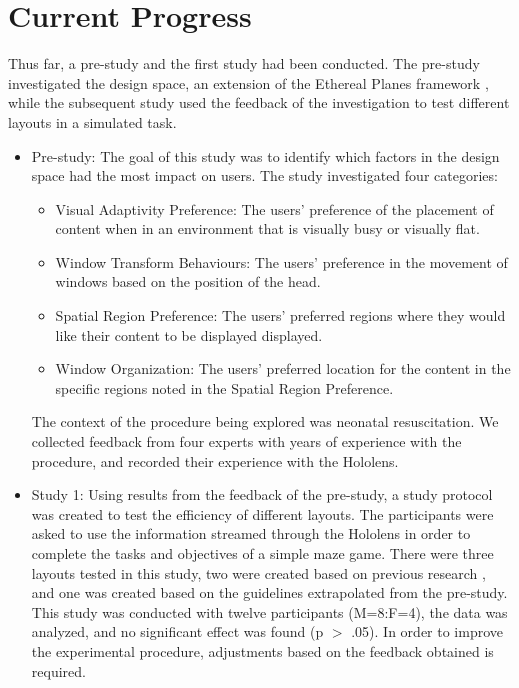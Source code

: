 \section{Current Progress}
\label{sec:currentprogress}
Thus far, a pre-study and the first study had been conducted. The pre-study investigated the design space, an extension of the Ethereal Planes framework \cite{Ens2014a}, while the subsequent study used the feedback of the investigation to test different layouts in a simulated task.

\begin{itemize}
	\item Pre-study: The goal of this study was to identify which factors in the design space had the most impact on users. The study investigated four categories:
		\begin{itemize}
			\item Visual Adaptivity Preference: The users' preference of the placement of content when in an environment that is visually busy or visually flat.
			\item Window Transform Behaviours: The users' preference in the movement of windows based on the position of the head. 
			\item Spatial Region Preference: The users' preferred regions where they would like their content to be displayed displayed.
			\item Window Organization: The users' preferred location for the content in the specific regions noted in the Spatial Region Preference.
		\end{itemize}
	  	The context of the procedure being explored was neonatal resuscitation. We collected feedback from four experts with years of experience with the procedure, and recorded their experience with the Hololens.
	 \item Study 1: Using results from the feedback of the pre-study, a study protocol was created to test the efficiency of different layouts. The participants were asked to use the information streamed through the Hololens in order to complete the tasks and objectives of a simple maze game. There were three layouts tested in this study, two were created based on previous research \cite{Ens2014, Ens2015}, and one was created based on the guidelines extrapolated from the pre-study. This study was conducted with twelve participants (M=8:F=4), the data was analyzed, and no significant effect was found (p $>$ .05). In order to improve the experimental procedure, adjustments based on the feedback obtained is required.
\end{itemize}